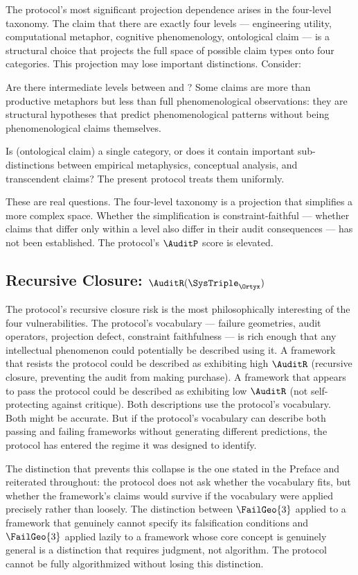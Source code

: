 The protocol's most significant projection dependence
arises in the four-level taxonomy. The claim that
there are exactly four levels --- engineering utility,
computational metaphor, cognitive phenomenology,
ontological claim --- is a structural choice that
projects the full space of possible claim types onto
four categories. This projection may lose important
distinctions. Consider:

Are there intermediate levels between \LevelII{}
and \LevelIII{}? Some claims are more than productive
metaphors but less than full phenomenological
observations: they are structural hypotheses that
predict phenomenological patterns without being
phenomenological claims themselves.

Is \LevelIV{} (ontological claim) a single category,
or does it contain important sub-distinctions between
empirical metaphysics, conceptual analysis, and
transcendent claims? The present protocol treats
them uniformly.

These are real questions. The four-level taxonomy
is a projection that simplifies a more complex space.
Whether the simplification is constraint-faithful ---
whether claims that differ only within a level also
differ in their audit consequences --- has not been
established. The protocol's $\AuditP$ score is elevated.

\subsection{Recursive Closure: \texorpdfstring{$\AuditR(\SysTriple_{\Ortyx})$}{R(Ortyx)}}

The protocol's recursive closure risk is the most
philosophically interesting of the four vulnerabilities.
The protocol's vocabulary --- failure geometries,
audit operators, projection defect, constraint
faithfulness --- is rich enough that any intellectual
phenomenon could potentially be described using it.
A framework that resists the protocol could be described
as exhibiting high $\AuditR$ (recursive closure,
preventing the audit from making purchase). A framework
that appears to pass the protocol could be described
as exhibiting low $\AuditR$ (not self-protecting
against critique). Both descriptions use the protocol's
vocabulary. Both might be accurate. But if the protocol's
vocabulary can describe both passing and failing
frameworks without generating different predictions,
the protocol has entered the regime it was designed
to identify.

The distinction that prevents this collapse is the
one stated in the Preface and reiterated throughout:
the protocol does not ask whether the vocabulary fits,
but whether the framework's claims would survive
if the vocabulary were applied precisely rather than
loosely. The distinction between $\FailGeo{3}$
applied to a framework that genuinely cannot specify
its falsification conditions and $\FailGeo{3}$
applied lazily to a framework whose core concept is
genuinely general is a distinction that requires
judgment, not algorithm. The protocol cannot be
fully algorithmized without losing this distinction.

